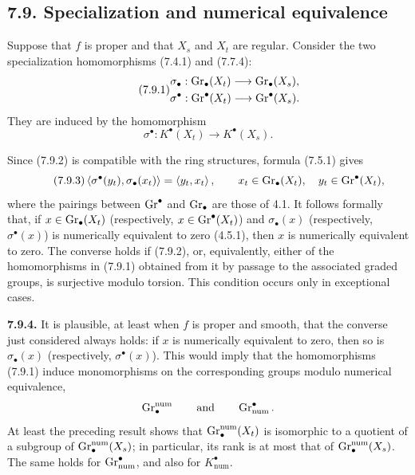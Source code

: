 \subsection*{7.9. Specialization and numerical equivalence}
Suppose that $f$ is proper and that $X_s$ and $X_t$ are regular. Consider
the two specialization homomorphisms (7.4.1) and (7.7.4):
\begin{equation}\tag{7.9.1}
\begin{gathered}
\sigma_\bullet:\operatorname{Gr}_\bullet(X_t)\longrightarrow\operatorname{Gr}_\bullet(X_s),\\
\sigma^\bullet:\operatorname{Gr}^\bullet(X_t)\longrightarrow\operatorname{Gr}^\bullet(X_s).
\end{gathered}
\end{equation}
They are induced by the homomorphism
\begin{equation}\tag{7.9.2}
\sigma^\bullet:K^\bullet(X_t)\longrightarrow K^\bullet(X_s).
\end{equation}

Since (7.9.2) is compatible with the ring structures, formula (7.5.1)
gives
\begin{equation}\tag{7.9.3}
\left\langle\sigma^\bullet(y_t),\sigma_\bullet(x_t)\right\rangle
=\left\langle y_t,x_t\right\rangle,
\qquad
x_t\in\operatorname{Gr}_\bullet(X_t),\quad y_t\in\operatorname{Gr}^\bullet(X_t),
\end{equation}
where the pairings between $\operatorname{Gr}^\bullet$ and $\operatorname{Gr}_\bullet$ are those of
4.1. It follows formally that, if $x\in\operatorname{Gr}_\bullet(X_t)$ (respectively,
$x\in\operatorname{Gr}^\bullet(X_t)$) and $\sigma_\bullet(x)$ (respectively,
$\sigma^\bullet(x)$) is numerically equivalent to zero (4.5.1), then $x$
is numerically equivalent to zero. The converse holds if (7.9.2), or,
equivalently, either of the homomorphisms in (7.9.1) obtained from it by passage to
the associated graded groups, is surjective modulo torsion. This condition
occurs only in exceptional cases.

\textbf{7.9.4.}
It is plausible, at least when $f$ is proper and smooth, that the converse
just considered always holds: if $x$ is numerically equivalent to zero,
then so is $\sigma_\bullet(x)$ (respectively, $\sigma^\bullet(x)$). This
would imply that the homomorphisms (7.9.1) induce monomorphisms on the
corresponding groups modulo numerical equivalence,
\[
\operatorname{Gr}_\bullet^{\mathrm{num}}
\qquad\text{and}\qquad
\operatorname{Gr}_{\mathrm{num}}^\bullet.
\]
At least the preceding result shows that
$\operatorname{Gr}_\bullet^{\mathrm{num}}(X_t)$ is isomorphic to a quotient of a subgroup
of $\operatorname{Gr}_\bullet^{\mathrm{num}}(X_s)$; in particular, its rank is at most
that of $\operatorname{Gr}_\bullet^{\mathrm{num}}(X_s)$. The same holds for
$\operatorname{Gr}_{\mathrm{num}}^\bullet$, and also for $K_{\mathrm{num}}^\bullet$.

